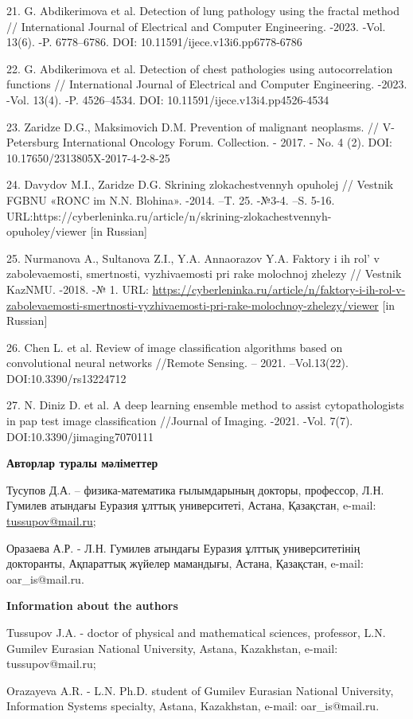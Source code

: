 21. G. Abdikerimova et al. Detection of lung pathology using the fractal
method // International Journal of Electrical and Computer Engineering.
-2023. -Vol. 13(6). -P. 6778--6786. DOI:
10.11591/ijece.v13i6.pp6778-6786

22. G. Abdikerimova et al. Detection of chest pathologies using
autocorrelation functions // International Journal of Electrical and
Computer Engineering. -2023. -Vol. 13(4). -P. 4526--4534. DOI:
10.11591/ijece.v13i4.pp4526-4534

23. Zaridze D.G., Maksimovich D.M. Prevention of malignant neoplasms. //
V-Petersburg International Oncology Forum. Collection. - 2017. - No. 4
(2). DOI: 10.17650/2313805X-2017-4-2-8-25

24. Davydov M.I., Zaridze D.G. Skrining zlokachestvennyh opuholej //
Vestnik FGBNU «RONC im N.N. Blohina». -2014. --T. 25. -№3-4. --S. 5-16.
URL:https://cyberleninka.ru/article/n/skrining-zlokachestvennyh-opuholey/viewer
{[}in Russian{]}

25. Nurmanova A., Sultanova Z.I., Y.A. Annaorazov Y.A. Faktory i ih
rol'{} v zabolevaemosti, smertnosti, vyzhivaemosti pri
rake molochnoj zhelezy // Vestnik KazNMU. -2018. -№ 1. URL:
\url{https://cyberleninka.ru/article/n/faktory-i-ih-rol-v-zabolevaemosti-smertnosti-vyzhivaemosti-pri-rake-molochnoy-zhelezy/viewer}
{[}in Russian{]}

26. Chen L. et al. Review of image classification algorithms based on
convolutional neural networks //Remote Sensing. -- 2021. --Vol.13(22).
DOI:10.3390/rs13224712

27. N. Diniz D. et al. A deep learning ensemble method to assist
cytopathologists in pap test image classification //Journal of Imaging.
-2021. -Vol. 7(7). DOI:10.3390/jimaging7070111

{\bfseries Авторлар туралы мәліметтер}

Тусупов Д.А. -- физика-математика ғылымдарының докторы, профессор, Л.Н.
Гумилев атындағы Еуразия ұлттық университеті, Астана, Қазақстан, e-mail:
\href{mailto:oaris.83@gmail.com}{tussupov@mail.ru};

Оразаева А.Р. - Л.Н. Гумилев атындағы Еуразия ұлттық университетінің
докторанты, Ақпараттық жүйелер мамандығы, Астана, Қазақстан, e-mail:
oar\_is@mail.ru.

{\bfseries Information about the authors}

Tussupov J.A. - doctor of physical and mathematical sciences, professor,
L.N. Gumilev Eurasian National University, Astana, Kazakhstan, e-mail:
tussupov@mail.ru;

Orazayeva A.R. - L.N. Ph.D. student of Gumilev Eurasian National
University, Information Systems specialty, Astana, Kazakhstan, e-mail:
oar\_is@mail.ru.